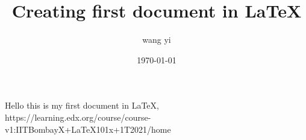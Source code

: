 \documentclass{article}
\title{Creating first document in \LaTeX}
\author{wang yi}
\date{\today}
\begin{document}
    \maketitle
    \paragraph{}
Hello this is  my first document in LaTeX,\\
https://learning.edx.org/course/course-v1:IITBombayX+LaTeX101x+1T2021/home
\end{document}
